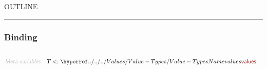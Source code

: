 


    OUTLINE
  \tableofcontents
\begin{center}
\rule{3in}{0.4pt}
\end{center}

\subsubsection{Binding}\hypertarget{binding}{}\label{binding}

\begin{align*}
  [ \
  \KEY{Type} \quad & \NAMEREF{environments} \\
  \KEY{Alias} \quad & \NAMEREF{envs} \\
  \KEY{Datatype} \quad & \NAMEREF{identifiers} \\
  \KEY{Alias} \quad & \NAMEREF{ids} \\
  \KEY{Funcon} \quad & \NAMEREF{identifier-tagged} \\
  \KEY{Alias} \quad & \NAMEREF{id-tagged} \\
  \KEY{Funcon} \quad & \NAMEREF{fresh-identifier} \\
  \KEY{Entity} \quad & \NAMEREF{environment} \\
  \KEY{Alias} \quad & \NAMEREF{env} \\
  \KEY{Funcon} \quad & \NAMEREF{initialise-binding} \\
  \KEY{Funcon} \quad & \NAMEREF{bind-value} \\
  \KEY{Alias} \quad & \NAMEREF{bind} \\
  \KEY{Funcon} \quad & \NAMEREF{unbind} \\
  \KEY{Funcon} \quad & \NAMEREF{bound-directly} \\
  \KEY{Funcon} \quad & \NAMEREF{bound-value} \\
  \KEY{Alias} \quad & \NAMEREF{bound} \\
  \KEY{Funcon} \quad & \NAMEREF{closed} \\
  \KEY{Funcon} \quad & \NAMEREF{scope} \\
  \KEY{Funcon} \quad & \NAMEREF{accumulate} \\
  \KEY{Funcon} \quad & \NAMEREF{collateral} \\
  \KEY{Funcon} \quad & \NAMEREF{bind-recursively} \\
  \KEY{Funcon} \quad & \NAMEREF{recursive}
  \ ]
\end{align*}
\begin{align*}
  \KEY{Meta-variables} \quad
  & \VAR{T} <: \NAMEHYPER{../../../Values}{Value-Types}{values}
\end{align*}
